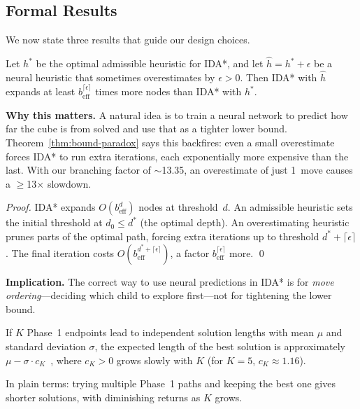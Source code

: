 \documentclass[graybox]{svmult}
\begin{document}
\subsection{Formal Results}
\label{sec:formal}

We now state three results that guide our design choices.

\begin{theorem}
\label{thm:bound-paradox}
Let $h^*$ be the optimal admissible heuristic for IDA*, and let $\hat{h} = h^* + \epsilon$ be a neural heuristic that sometimes overestimates by $\epsilon > 0$. Then IDA* with $\hat{h}$ expands at least $b_{\mathrm{eff}}^{\lceil\epsilon\rceil}$ times more nodes than IDA* with $h^*$.
\end{theorem}

\textbf{Why this matters.} A natural idea is to train a neural network to predict how far the cube is from solved and use that as a tighter lower bound. Theorem~\ref{thm:bound-paradox} says this backfires: even a small overestimate forces IDA* to run extra iterations, each exponentially more expensive than the last. With our branching factor of $\sim$13.35, an overestimate of just 1~move causes a $\geq$13$\times$ slowdown.

\begin{proof}
IDA* expands $O(b_{\mathrm{eff}}^d)$ nodes at threshold~$d$. An admissible heuristic sets the initial threshold at $d_0 \leq d^*$ (the optimal depth). An overestimating heuristic prunes parts of the optimal path, forcing extra iterations up to threshold $d^* + \lceil\epsilon\rceil$. The final iteration costs $O(b_{\mathrm{eff}}^{d^*+\lceil\epsilon\rceil})$, a factor $b_{\mathrm{eff}}^{\lceil\epsilon\rceil}$ more.
\qed
\end{proof}

\textbf{Implication.} The correct way to use neural predictions in IDA* is for \emph{move ordering}---deciding which child to explore first---not for tightening the lower bound.

\begin{proposition}
\label{prop:order-stat}
If $K$ Phase~1 endpoints lead to independent solution lengths with mean $\mu$ and standard deviation $\sigma$, the expected length of the best solution is approximately $\mu - \sigma \cdot c_K$~\cite{david2003}, where $c_K > 0$ grows slowly with $K$ (for $K{=}5$, $c_K \approx 1.16$).
\end{proposition}

In plain terms: trying multiple Phase~1 paths and keeping the best one gives shorter solutions, with diminishing returns as $K$ grows.
\end{document}
